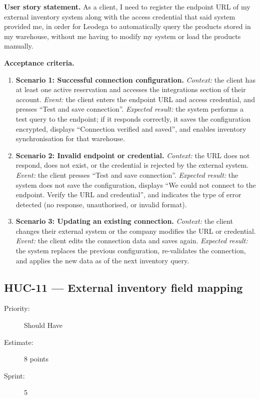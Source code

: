 \documentclass[11pt,a4paper,oneside]{report}
\begin{document}
\textbf{User story statement.} As a client, I need to register the endpoint URL of my external inventory system along with the access credential that said system provided me, in order for Leodega to automatically query the products stored in my warehouse, without me having to modify my system or load the products manually.

\textbf{Acceptance criteria.}
\begin{enumerate}
\item \textbf{Scenario 1: Successful connection configuration.} \emph{Context:} the client has at least one active reservation and accesses the integrations section of their account. \emph{Event:} the client enters the endpoint URL and access credential, and presses ``Test and save connection''. \emph{Expected result:} the system performs a test query to the endpoint; if it responds correctly, it saves the configuration encrypted, displays ``Connection verified and saved'', and enables inventory synchronisation for that warehouse.
\item \textbf{Scenario 2: Invalid endpoint or credential.} \emph{Context:} the URL does not respond, does not exist, or the credential is rejected by the external system. \emph{Event:} the client presses ``Test and save connection''. \emph{Expected result:} the system does not save the configuration, displays ``We could not connect to the endpoint. Verify the URL and credential'', and indicates the type of error detected (no response, unauthorised, or invalid format).
\item \textbf{Scenario 3: Updating an existing connection.} \emph{Context:} the client changes their external system or the company modifies the URL or credential. \emph{Event:} the client edits the connection data and saves again. \emph{Expected result:} the system replaces the previous configuration, re-validates the connection, and applies the new data as of the next inventory query.
\end{enumerate}

\subsection{HUC-11 --- External inventory field mapping}
\label{req:HUC-11}
\begin{description}
\item[Priority:] Should Have \quad \item[Estimate:] 8 points \quad \item[Sprint:] 5
\end{description}
\end{document}
